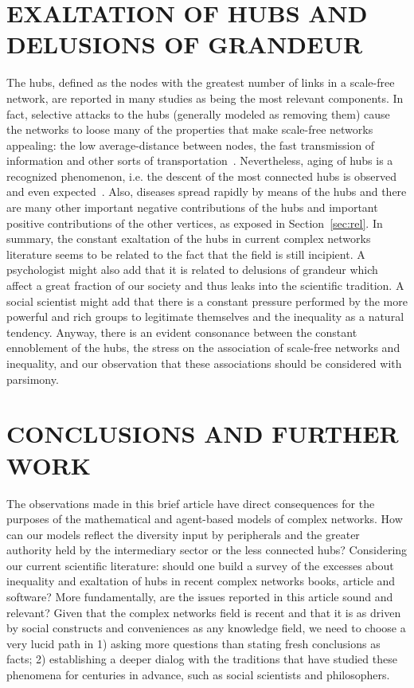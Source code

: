 \documentclass[12pt,fleqn]{article}
\begin{document}
\section{EXALTATION OF HUBS AND DELUSIONS OF GRANDEUR}\label{sec:delusion}
The hubs, defined as the nodes with the greatest number of links in a scale-free network,
are reported in many studies as being the most relevant components.
In fact, selective attacks to the hubs (generally modeled as removing them)
cause the networks to loose many of the properties that make scale-free networks
appealing: the low average-distance between nodes, the fast transmission of information
and other sorts of transportation~\citep{networks}.
Nevertheless, aging of hubs is a recognized phenomenon,
i.e. the descent of the most connected hubs is observed
and even expected~\citep{aging}.
Also, diseases spread rapidly by means of the hubs 
and there are many other important negative contributions
of the hubs and important positive contributions of the
other vertices, as exposed in Section~\ref{sec:rel}.
In summary, the constant exaltation of the hubs in current
complex networks literature seems to be related to the
fact that the field is still incipient.
A psychologist might also add that it is related to
delusions of grandeur which affect a great fraction of
our society and thus leaks into the scientific tradition.
A social scientist might add that there is a constant
pressure performed by the more powerful and rich groups
to legitimate themselves and the inequality as a natural tendency.
Anyway, there is an evident consonance between the
constant ennoblement of the hubs, the stress on the association
of scale-free networks and inequality,
and our observation that these associations should be
considered with parsimony.


\section{CONCLUSIONS AND FURTHER WORK}\label{sec:con}
The observations made in this brief article have direct consequences for
the purposes of the mathematical and agent-based models of complex networks.
How can our models reflect the diversity input by peripherals
and the greater authority held by the intermediary sector or the less connected hubs?
Considering our current scientific literature:
should one build a survey of the
excesses about inequality and exaltation of hubs in recent complex networks books, article and software?
More fundamentally, are the issues reported in this article sound
and relevant?
Given that the complex networks field is recent and that it is as driven
by social constructs and conveniences as any knowledge field,
we need to choose a very lucid path
in 1) asking more questions than stating fresh conclusions as facts;
2) establishing a deeper dialog with the traditions that have studied
these phenomena for centuries in advance, such as social scientists and philosophers.
\end{document}
